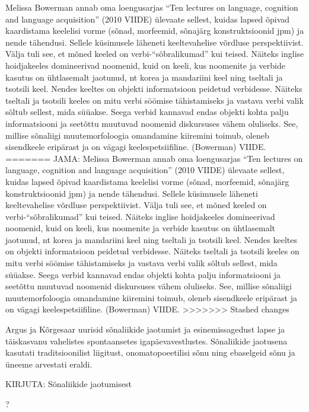 \documentclass[12pt]{article}
\begin{document}
 Melissa Bowerman annab oma loengusarjas ``Ten lectures on language, cognition and language acquisition'' (2010 VIIDE) ülevaate sellest, kuidas lapsed õpivad kaardistama keelelisi vorme (sõnad, morfeemid, sõnajärg konstruktsioonid jpm) ja nende tähendusi. Sellele küsimusele läheneti keeltevahelise võrdluse perspektiivist. Välja tuli see, et mõned keeled on verbi-``sõbralikumad'' kui teised. Näiteks inglise hoidjakeeles domineerivad noomenid, kuid on keeli, kus noomenite ja verbide kasutus on ühtlasemalt jaotunud, nt korea ja mandariini keel ning tseltali ja tsotsili keel. Nendes keeltes on objekti informatsioon peidetud verbidesse. Näiteks tseltali ja tsotsili keeles on mitu verbi söömise tähistamiseks ja vastava verbi valik sõltub sellest, mida süüakse. Seega verbid kannavad endas objekti kohta palju informatsiooni ja seetõttu muutuvad noomenid diskursuses vähem oluliseks. See, millise sõnaliigi muutemorfoloogia omandamine kiiremini toimub, oleneb sisendkeele eripärast ja on vägagi keelespetsiifiline. (Bowerman) VIIDE.
=======
JAMA:
Melissa Bowerman annab oma loengusarjas ``Ten lectures on language, cognition and language acquisition'' (2010 VIIDE) ülevaate sellest, kuidas lapsed õpivad kaardistama keelelisi vorme (sõnad, morfeemid, sõnajärg konstruktsioonid jpm) ja nende tähendusi. Sellele küsimusele läheneti keeltevahelise võrdluse perspektiivist. Välja tuli see, et mõned keeled on verbi-``sõbralikumad'' kui teised. Näiteks inglise hoidjakeeles domineerivad noomenid, kuid on keeli, kus noomenite ja verbide kasutus on ühtlasemalt jaotunud, nt korea ja mandariini keel ning tseltali ja tsotsili keel. Nendes keeltes on objekti informatsioon peidetud verbidesse. Näiteks tseltali ja tsotsili keeles on mitu verbi söömise tähistamiseks ja vastava verbi valik sõltub sellest, mida süüakse. Seega verbid kannavad endas objekti kohta palju informatsiooni ja seetõttu muutuvad noomenid diskursuses vähem oluliseks. See, millise sõnaliigi muutemorfoloogia omandamine kiiremini toimub, oleneb sisendkeele eripärast ja on vägagi keelespetsiifiline. (Bowerman) VIIDE.
>>>>>>> Stashed changes

Argus ja Kõrgesaar uurisid sõnaliikide jaotumist ja esinemissagedust lapse ja täiskasvanu vahelistes spontaansetes igapäevavestlustes. Sõnaliikide jaotusena kasutati traditsioonilist liigitust, onomatopoeetilisi sõnu ning ebaselgeid sõnu ja üneeme arvestati eraldi. 




KIRJUTA:
Sõnaliikide jaotumisest

?
\end{document}
